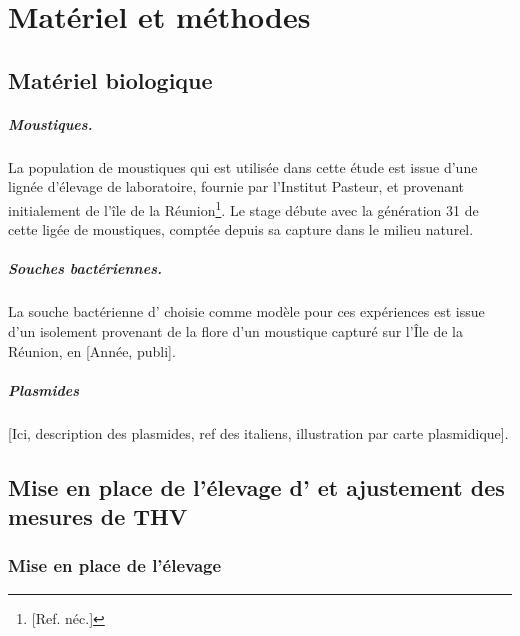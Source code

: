 \chapter{Matériel et méthodes}

\section{Matériel biologique}

\paragraph{Moustiques.}
\label{par:moustiques}
La population de moustiques  qui est utilisée dans cette étude est issue d'une lignée d'élevage de laboratoire, fournie par l'Institut Pasteur, et provenant initialement de l'île de la Réunion\footnote{[Ref. néc.]}.
Le stage débute avec la génération 31 de cette ligée de moustiques, comptée depuis sa capture dans le milieu naturel.

\paragraph{Souches bactériennes.}
La souche bactérienne d' choisie comme modèle pour ces expériences est issue d'un isolement provenant de la flore d'un moustique capturé sur l'Île de la Réunion, en [Année, publi]\cite{zouache2011}.

\paragraph{Plasmides}
[Ici, description des plasmides, ref des italiens, illustration par carte plasmidique].

\section{Mise en place de l'élevage d' et ajustement des mesures de THV}

\subsection{Mise en place de l'élevage}

